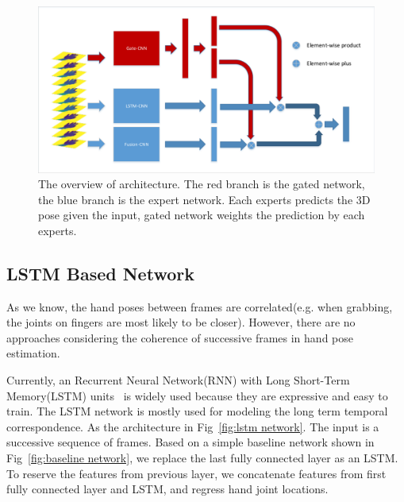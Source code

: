 \documentclass[journal,comsoc]{IEEEtran}
\let\MYoriglatexcaption\caption
\renewcommand{\caption}[2][\relax]{\MYoriglatexcaption[#2]{#2}}
\begin{document}
\begin{figure}[t]
    \centering
    \includegraphics[width=1\linewidth]{src/network/architecture.pdf}
    \caption{The overview of architecture. The red branch is the gated network, the blue branch is the expert network.
    Each experts predicts the 3D pose given the input, gated network weights the prediction by each experts.}
\label{fig:architecture}
\end{figure}

\subsection{LSTM Based Network}\label{sec:lstm netowork}
As we know, the hand poses between frames are correlated(e.g. when grabbing, the joints on fingers are most likely to be closer).
However, there are no approaches considering the coherence of successive frames in hand pose estimation.

Currently, an Recurrent Neural Network(RNN) with Long Short-Term Memory(LSTM) units~\cite{zaremba2014learning} is widely used
because they are expressive and easy to train. The LSTM network is mostly used for modeling the long term temporal correspondence.
As the architecture in Fig~\ref{fig:lstm network}. The input is a successive sequence of frames.
Based on a simple baseline network shown in Fig~\ref{fig:baseline network}, we replace the last fully connected layer as an LSTM.
To reserve the features from previous layer, we concatenate features from first fully connected layer and LSTM, and regress hand joint locations.
\end{document}

